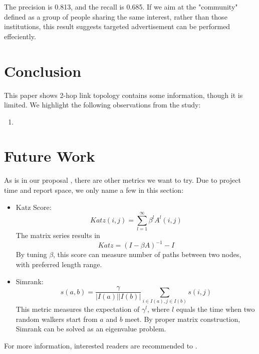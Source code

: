 \documentclass[11pt,a4paper]{article}
\begin{document}
The precision is 0.813, and the recall is 0.685. 
If we aim at the "community" defined as a group 
of people sharing the same interest, rather than 
those institutions, this result suggests targeted 
advertisement can be performed effeciently. 


\section{Conclusion}

This paper shows 2-hop link topology contains some information, 
though it is limited. We highlight the following 
observations from the study:
\begin{enumerate}
	\item 
\end{enumerate}

\section{Future Work}

As is in our proposal \cite{hu2011-cd2hop}, there are other metrics
we want to try. Due to project time and report space, we only name 
a few in this section:
\begin{itemize}
	\item Katz Score:
			\begin{equation}
				Katz(i,j)=\sum_{l=1}^{\infty}{\beta^lA^l(i,j)}
			\end{equation}
			The matrix series results in 
			\begin{equation}
				Katz = (I-\beta A)^{-1} - I
			\end{equation}
			By tuning $\beta$, this score can measure number of paths between 
			two nodes, with preferred length range. 
	\item Simrank:
			\begin{equation}
				s(a,b)=\frac{\gamma}{|I(a)||I(b)|}
				\sum_{i \in I(a), j \in I(b)} s(i,j)
			\end{equation}
			This metric measures the expectation of $\gamma^l$, where $l$ equals 
			the time when two random walkers start from $a$ and $b$ meet. By proper 
			matrix construction, Simrank can be solved as an eigenvalue problem. 
\end{itemize}
For more information, interested readers are recommended to \cite{aggarwal2011social}. 
\end{document}
